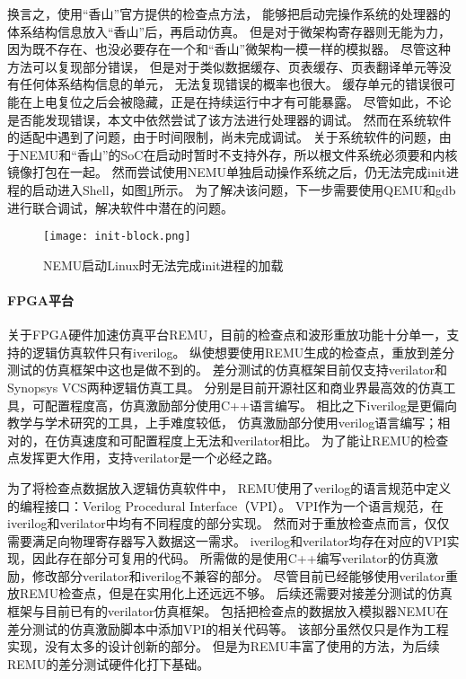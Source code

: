 换言之，使用“香山”官方提供的检查点方法，
能够把启动完操作系统的处理器的体系结构信息放入“香山”后，再启动仿真。
但是对于微架构寄存器则无能为力，
因为既不存在、也没必要存在一个和“香山”微架构一模一样的模拟器。
尽管这种方法可以复现部分错误，
但是对于类似数据缓存、页表缓存、页表翻译单元等没有任何体系结构信息的单元，
无法复现错误的概率也很大。
缓存单元的错误很可能在上电复位之后会被隐藏，正是在持续运行中才有可能暴露。
尽管如此，不论是否能发现错误，本文中依然尝试了该方法进行处理器的调试。
然而在系统软件的适配中遇到了问题，由于时间限制，尚未完成调试。
关于系统软件的问题，由于NEMU和“香山”的SoC在启动时暂时不支持外存，所以根文件系统必须要和内核镜像打包在一起。
然而尝试使用NEMU单独启动操作系统之后，仍无法完成init进程的启动进入Shell，如图\ref{fig:init-block}所示。
为了解决该问题，下一步需要使用QEMU和gdb进行联合调试，解决软件中潜在的问题。

\begin{figure}[htbp]
    \centering
    \texttt{[image: init-block.png]}
    \caption{NEMU启动Linux时无法完成init进程的加载}
    \label{fig:init-block}
\end{figure}

\paragraph{FPGA平台}
关于FPGA硬件加速仿真平台REMU，目前的检查点和波形重放功能十分单一，支持的逻辑仿真软件只有iverilog。
纵使想要使用REMU生成的检查点，重放到差分测试的仿真框架中这也是做不到的。
差分测试的仿真框架目前仅支持verilator和Synopsys VCS两种逻辑仿真工具。
分别是目前开源社区和商业界最高效的仿真工具，可配置程度高，仿真激励部分使用C++语言编写。
相比之下iverilog是更偏向教学与学术研究的工具，上手难度较低，
仿真激励部分使用verilog语言编写；相对的，在仿真速度和可配置程度上无法和verilator相比。
为了能让REMU的检查点发挥更大作用，支持verilator是一个必经之路。

为了将检查点数据放入逻辑仿真软件中，
REMU使用了verilog的语言规范中定义的编程接口：Verilog Procedural Interface（VPI）。
VPI作为一个语言规范，在iverilog和verilator中均有不同程度的部分实现。
然而对于重放检查点而言，仅仅需要满足向物理寄存器写入数据这一需求。
iverilog和verilator均存在对应的VPI实现，因此存在部分可复用的代码。
所需做的是使用C++编写verilator的仿真激励，修改部分verilator和iverilog不兼容的部分。
尽管目前已经能够使用verilator重放REMU检查点，但是在实用化上还远远不够。
后续还需要对接差分测试的仿真框架与目前已有的verilator仿真框架。
包括把检查点的数据放入模拟器NEMU在差分测试的仿真激励脚本中添加VPI的相关代码等。
该部分虽然仅只是作为工程实现，没有太多的设计创新的部分。
但是为REMU丰富了使用的方法，为后续REMU的差分测试硬件化打下基础。

